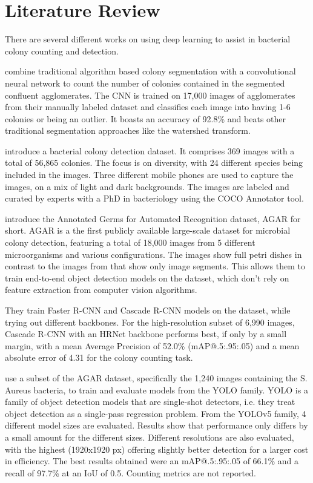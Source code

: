 \chapter{Literature Review}
\label{ch:literature_review}

There are several different works on using deep learning to assist in bacterial colony counting and detection.

\citet{ferrari2015bacterial} combine traditional algorithm based colony segmentation with a convolutional neural network to count the number of colonies contained in the segmented confluent agglomerates. The CNN is trained on 17,000 images of agglomerates from their manually labeled dataset and classifies each image into having 1-6 colonies or being an outlier. It boasts an accuracy of 92.8\% and beats other traditional segmentation approaches like the watershed transform.

\citet{Makrai2023} introduce a bacterial colony detection dataset. It comprises 369 images with a total of 56,865 colonies. The focus is on diversity, with 24 different species being included in the images. Three different mobile phones are used to capture the images, on a mix of light and dark backgrounds. The images are labeled and curated by experts with a PhD in bacteriology using the COCO Annotator tool.

\citet{majchrowska2021agar} introduce the Annotated Germs for Automated Recognition dataset, AGAR for short. AGAR is a the first publicly available large-scale dataset for microbial colony detection, featuring a total of 18,000 images from 5 different microorganisms and various configurations. The images show full petri dishes in contrast to the images from \citet{ferrari2015bacterial} that show only image segments. This allows them to train end-to-end object detection models on the dataset, which don't rely on feature extraction from computer vision algorithms.

They train Faster R-CNN and Cascade R-CNN models on the dataset, while trying out different backbones. For the high-resolution subset of 6,990 images, Cascade R-CNN with an HRNet backbone performs best, if only by a small margin, with a mean Average Precision of 52.0\% (mAP@.5:.95:.05) and a mean absolute error of 4.31 for the colony counting task.

\citet{whipp2022yolo} use a subset of the AGAR dataset, specifically the 1,240 images containing the S. Aureus bacteria, to train and evaluate models from the YOLO family. YOLO is a family of object detection models that are single-shot detectors, i.e. they treat object detection as a single-pass regression problem. From the YOLOv5 family, 4 different model sizes are evaluated. Results show that performance only differs by a small amount for the different sizes. Different resolutions are also evaluated, with the highest (1920x1920 px) offering slightly better detection for a larger cost in efficiency. The best results obtained were an mAP@.5:.95:.05 of 66.1\% and a recall of 97.7\% at an IoU of 0.5. Counting metrics are not reported.

